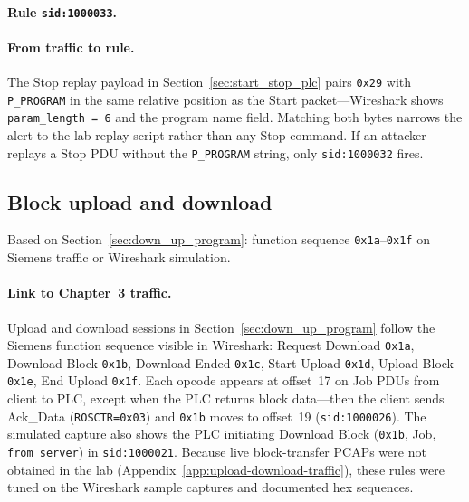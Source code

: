 \paragraph{Rule \texttt{sid:1000033}.}

\paragraph{From traffic to rule.}
The Stop replay payload in Section~\ref{sec:start_stop_plc} pairs \texttt{0x29} with \texttt{P\_PROGRAM} in the same relative position as the Start packet---Wireshark shows \texttt{param\_length = 6} and the program name field. Matching both bytes narrows the alert to the lab replay script rather than any Stop command. If an attacker replays a Stop PDU without the \texttt{P\_PROGRAM} string, only \texttt{sid:1000032} fires.

\subsection{Block upload and download}
\label{sec:rules-up-download}

Based on Section~\ref{sec:down_up_program}: function sequence \texttt{0x1a}--\texttt{0x1f} on Siemens traffic or Wireshark simulation.

\paragraph{Link to Chapter~3 traffic.}
Upload and download sessions in Section~\ref{sec:down_up_program} follow the Siemens function sequence visible in Wireshark: Request Download \texttt{0x1a}, Download Block \texttt{0x1b}, Download Ended \texttt{0x1c}, Start Upload \texttt{0x1d}, Upload Block \texttt{0x1e}, End Upload \texttt{0x1f}. Each opcode appears at offset~17 on Job PDUs from client to PLC, except when the PLC returns block data---then the client sends Ack\_Data (\texttt{ROSCTR=0x03}) and \texttt{0x1b} moves to offset~19 (\texttt{sid:1000026}). The simulated capture also shows the PLC initiating Download Block (\texttt{0x1b}, Job, \texttt{from\_server}) in \texttt{sid:1000021}. Because live block-transfer PCAPs were not obtained in the lab (Appendix~\ref{app:upload-download-traffic}), these rules were tuned on the Wireshark sample captures and documented hex sequences.

